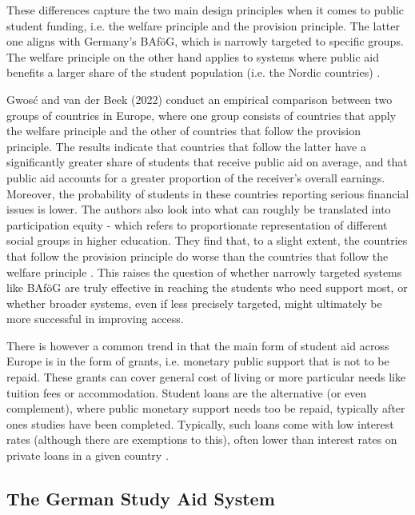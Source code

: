 These differences capture the two main design principles when it comes to public student funding, i.e. the welfare principle and the provision principle. The latter one aligns with Germany's BAföG, which is narrowly targeted to specific groups. The welfare principle on the other hand applies to systems where public aid benefits a larger share of the student population (i.e. the Nordic countries) \citep{gwosc_krisenbewaltigung_2022}.

Gwosć and van der Beek (2022) conduct an empirical comparison between two groups of countries in Europe, where one group consists of countries that apply the welfare principle and the other of countries that follow the provision principle. The results indicate that countries that follow the latter have a significantly greater share of students that receive public aid on average, and that public aid accounts for a greater proportion of the receiver’s overall earnings. Moreover, the probability of students in these countries reporting serious financial issues is lower. The authors also look into what can roughly be translated into participation equity - which refers to proportionate representation of different social groups in higher education. They find that, to a slight extent, the countries that follow the provision principle do worse than the countries that follow the welfare principle \citep{gwosc_krisenbewaltigung_2022}. This raises the question of whether narrowly targeted systems like BAföG are truly effective in reaching the students who need support most, or whether broader systems, even if less precisely targeted, might ultimately be more successful in improving access.

There is however a common trend in that the main form of student aid across Europe is in the form of grants, i.e. monetary public support that is not to be repaid. These grants can cover general cost of living or more particular needs like tuition fees or accommodation. Student loans are the alternative (or even complement), where public monetary support needs too be repaid, typically after ones studies have been completed. Typically, such loans come with low interest rates (although there are exemptions to this), often lower than interest rates on private loans in a given country \citep{schwarz_study_2004}.


%
%
\subsection{The German Study Aid System} 
\label{section:the-german-study-aid-system}

